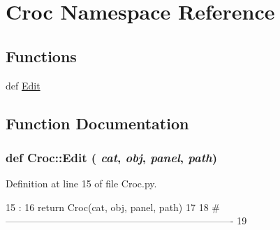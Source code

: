\hypertarget{namespaceCroc}{
\section{Croc Namespace Reference}
\label{namespaceCroc}
}
\subsection*{Functions}
\begin{DoxyCompactItemize}
\item 
def \hyperlink{namespaceCroc_aab897ecb0c926c695f3b2376d37ab5f8}{Edit}
\end{DoxyCompactItemize}


\subsection{Function Documentation}
\hypertarget{namespaceCroc_aab897ecb0c926c695f3b2376d37ab5f8}{
\subsubsection[{Edit}]{\setlength{\rightskip}{0pt plus 5cm}def Croc::Edit ( {\em cat}, \/   {\em obj}, \/   {\em panel}, \/   {\em path})}}
\label{namespaceCroc_aab897ecb0c926c695f3b2376d37ab5f8}


Definition at line 15 of file Croc.py.


\begin{DoxyCode}
15                                 :
16     return Croc(cat, obj, panel, path)
17 
18 #----------------------------------------------------------------------
19 

\end{DoxyCode}
